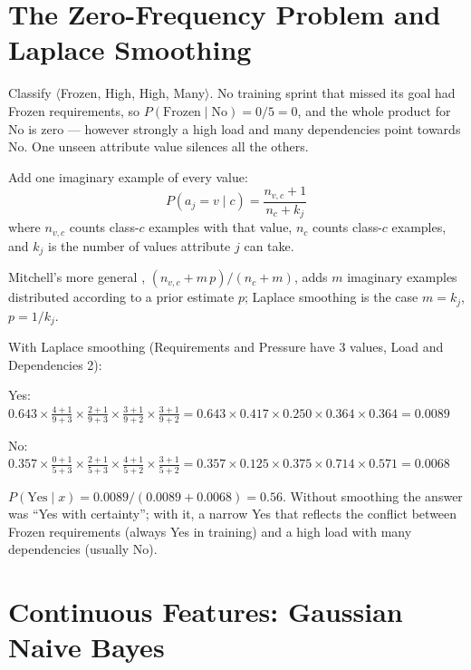 \section{The Zero-Frequency Problem and Laplace Smoothing}

Classify $\langle$Frozen, High, High, Many$\rangle$. No training sprint that missed
its goal had Frozen requirements, so $P(\text{Frozen} \mid \text{No}) = 0/5 = 0$,
and the whole product for No is zero --- however strongly a high load and many
dependencies point towards No. One unseen attribute value silences all the others.

\begin{definitionbox}
Add one imaginary example of every value:
\[
P(a_j = v \mid c) = \frac{n_{v,c} + 1}{n_c + k_j}
\]
where $n_{v,c}$ counts class-$c$ examples with that value, $n_c$ counts class-$c$
examples, and $k_j$ is the number of values attribute $j$ can take.
\end{definitionbox}

Mitchell's more general , $(n_{v,c} + m\,p)/(n_c + m)$, adds $m$
imaginary examples distributed according to a prior estimate $p$; Laplace smoothing
is the case $m = k_j$, $p = 1/k_j$.

\begin{worked}
With Laplace smoothing (Requirements and Pressure have 3 values, Load and
Dependencies 2):
\begin{tight}
  \item Yes: $0.643 \times \tfrac{4+1}{9+3} \times \tfrac{2+1}{9+3} \times
        \tfrac{3+1}{9+2} \times \tfrac{3+1}{9+2} = 0.643 \times 0.417 \times 0.250
        \times 0.364 \times 0.364 = 0.0089$
  \item No: $0.357 \times \tfrac{0+1}{5+3} \times \tfrac{2+1}{5+3} \times
        \tfrac{4+1}{5+2} \times \tfrac{3+1}{5+2} = 0.357 \times 0.125 \times 0.375
        \times 0.714 \times 0.571 = 0.0068$
\end{tight}
$P(\text{Yes} \mid x) = 0.0089/(0.0089 + 0.0068) = \mathbf{0.56}$. Without smoothing the
answer was ``Yes with certainty''; with it, a narrow Yes that reflects the conflict
between Frozen requirements (always Yes in training) and a high load with many
dependencies (usually No).
\end{worked}

\section{Continuous Features: Gaussian Naive Bayes}

